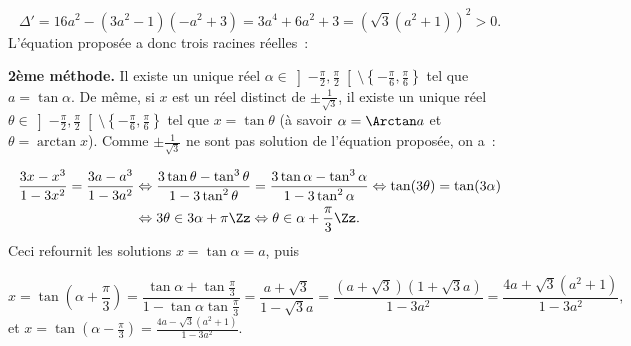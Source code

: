 {\begin{enumerate}
{$$\Delta'=16a^2-(3a^2-1)(-a^2+3)=3a^4+6a^2+3=(\sqrt{3}(a^2+1))^2>0.$$
L'équation proposée a donc trois racines réelles~:

\begin{center}
\end{center}
\textbf{2ème méthode.} Il existe un unique réel
$\alpha\in\left]-\frac{\pi}{2},\frac{\pi}{2}\right[\setminus\left\{-\frac{\pi}{6},\frac{\pi}{6}\right\}$ tel que $a=\tan\alpha$. De même,
si $x$ est un réel distinct de $\pm\frac{1}{\sqrt{3}}$, il existe un unique réel
$\theta\in\left]-\frac{\pi}{2},\frac{\pi}{2}\right[\setminus\left\{-\frac{\pi}{6},\frac{\pi}{6}\right\}$ tel que $x=\tan\theta$ (à savoir
$\alpha=\Arctan a$ et $\theta=\arctan x$). Comme $\pm\frac{1}{\sqrt{3}}$ ne sont pas solution de l'équation proposée,
on a~:

\begin{align*}
\frac{3x-x^3}{1-3x^2}=\frac{3a-a^3}{1-3a^2}&\Leftrightarrow\frac{3\tan\theta-\tan^3\theta}{1-3\tan^2\theta}
=\frac{3\tan\alpha-\tan^3\alpha}{1-3\tan^2\alpha}\Leftrightarrow\tan(3\theta)=\tan(3\alpha)\\
 &\Leftrightarrow3\theta\in3\alpha+\pi\Zz\Leftrightarrow\theta\in\alpha+\frac{\pi}{3}\Zz.
\end{align*}
Ceci refournit les solutions $x=\tan\alpha=a$, puis

$$x=\tan\left(\alpha+\frac{\pi}{3}\right)=\frac{\tan\alpha+\tan\frac{\pi}{3}}{1-\tan\alpha\tan\frac{\pi}{3}}=\frac{a+\sqrt{3}}{1
-\sqrt{3}a}=\frac{(a+\sqrt{3})(1+\sqrt{3}a)}{1-3a^2}=\frac{4a+\sqrt{3}(a^2+1)}{1-3a^2},$$
et $x=\tan\left(\alpha-\frac{\pi}{3}\right)=\frac{4a-\sqrt{3}(a^2+1)}{1-3a^2}$.}
\end{enumerate}
}
